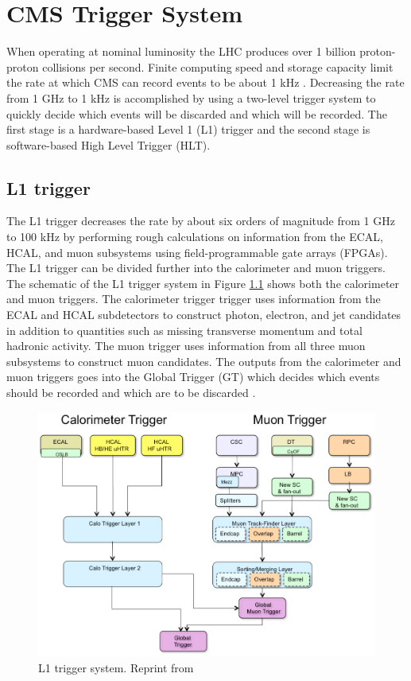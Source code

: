 \chapter{CMS Trigger System}

When operating at nominal luminosity the LHC produces over 1 billion proton-proton collisions per second.  Finite computing speed and storage capacity limit the rate at which CMS can record events to be about 1 kHz \cite{Cadamuro:2017slr}.  Decreasing the rate from 1 GHz to 1 kHz is accomplished by using a two-level trigger system to quickly decide which events will be discarded and which will be recorded. The first stage is a hardware-based Level 1 (L1) trigger and the second stage is software-based High Level Trigger (HLT).  

\section{L1 trigger}
The L1 trigger decreases the rate by about six orders of magnitude from 1 GHz to 100 kHz by performing rough calculations on information from the ECAL, HCAL, and muon subsystems using field-programmable gate arrays (FPGAs).  The L1 trigger can be divided further into the calorimeter and muon triggers.  The schematic of the L1 trigger system in Figure \ref{fig:l1trigger} shows both the calorimeter and muon triggers.  The calorimeter trigger trigger uses information from the ECAL and HCAL subdetectors to construct photon, electron, and jet candidates in addition to quantities such as missing transverse momentum and total hadronic activity.  The muon trigger uses information from all three muon subsystems to construct muon candidates.  The outputs from the calorimeter and muon triggers goes into the Global Trigger (GT) which decides which events should be recorded and which are to be discarded \cite{Wittmann_2016}.

\begin{figure}
	\centering
	\includegraphics[width=0.9\linewidth]{Figures/L1Trigger}
	\caption{L1 trigger system.  Reprint from \cite{L1Triggerfigure:2013yva}}
	\label{fig:l1trigger}
\end{figure}

